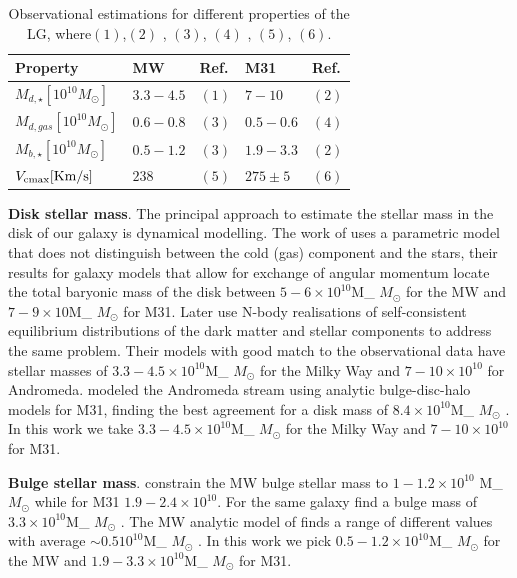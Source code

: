 \documentclass[useAMS,usenatbib]{mn2e}
\def \Msun {\ifmmode M_{\odot} \else $M_{\odot}$ \fi}
\begin{document}
\begin{table}
\centering
\begin{tabular}{|l|l|l|l|l|}
\hline
\hline
 Property & MW & Ref. & M31 & Ref.\\
\hline
$M_{d,\star}[10^{10}M_{\odot}]$       & $3.3-4.5 $ & $(1)$  & $7-10$      & $(2)$ \\
$M_{d,gas}[10^{10}M_{\odot}]$         & $0.6-0.8$  & $(3)$  & $0.5-0.6$  & $(4)$ \\
$M_{b,\star}[10^{10}M_{\odot}]$       & $0.5-1.2$  & $(3)$  & $1.9-3.3$   & $(2)$ \\
$V_{\rm cmax}[\text{Km/s}]$         & $238$      & $(5)$  & $275\pm 5$  & $(6)$ \\
\hline
\hline
\end{tabular}
\caption{Observational estimations for different properties of the LG,
  where$(1)$\citet{2001ApJ...555..393Z},$(2)$
  \citet{2006MNRAS.366..996G}, $(3)$\citet{2009A&A...505..497Y}, $(4)$
  \citet{2006A&A...453..459N}, $(5)$\citet{2005MNRAS.364..433B},
  $(6)$\citet{2008MNRAS.389.1911S}.}
\label{tab:lg-observations}
\end{table}


{\bf Disk stellar mass}. The principal approach to estimate the
stellar mass in the disk of our galaxy is dynamical modelling. The
work of \cite{Klypin2002} uses a parametric model that does not
distinguish between the cold (gas) component and the stars, their
results for galaxy models that allow for exchange of angular momentum
locate the total baryonic mass of the disk between $5-6\times
10^{10}$\Msun for the MW and $7-9\times 10$\Msun for M31. Later
\cite{Widrow2005} use N-body realisations of self-consistent
equilibrium distributions of the dark matter and stellar components to
address the same problem. Their models with good match to the
observational data have stellar masses of $3.3-4.5\times 10^{10}$\Msun
for the Milky Way and $7-10\times 10^{10}$ for
Andromeda. \citep{Geehan2006} modeled the Andromeda stream using
analytic bulge-disc-halo models for M31, finding the best agreement
for a disk mass of $8.4\times 10^{10}$\Msun. In this work we take
$3.3-4.5\times 10^{10}$\Msun for the Milky Way and $7-10\times
10^{10}$ for M31.

{\bf Bulge stellar mass}. \cite{Klypin2002} constrain the MW bulge
stellar mass to $1-1.2\times 10^{10}$ \Msun while for M31
$1.9-2.4\times 10^{10}$. For the same galaxy \citep{Geehan2006} find a
bulge mass of $3.3\times 10^{10}$\Msun. The MW analytic model of
\citep{Dehnen1998} finds a range of different values with average
$\sim 0.5 10^{10}$\Msun. In this work we pick $0.5-1.2 \times
10^{10}$\Msun for the MW and $1.9-3.3\times 10^{10}$\Msun for M31.
\end{document}
